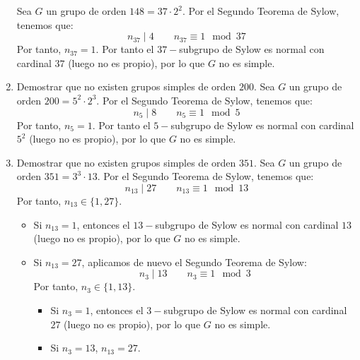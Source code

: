 \begin{ejercicio}
\begin{enumerate}
        Sea $G$ un grupo de orden $148=37\cdot 2^2$. Por el Segundo Teorema de Sylow, tenemos que:
        \begin{equation*}
            n_{37} \mid 4 \qquad n_{37} \equiv 1 \mod 37
        \end{equation*}
        Por tanto, $n_{37}=1$. Por tanto el $37-$subgrupo de Sylow es normal con cardinal $37$ (luego no es propio), por lo que $G$ no es simple.
        \item Demostrar que no existen grupos simples de orden $200$.
        Sea $G$ un grupo de orden $200=5^2\cdot 2^3$. Por el Segundo Teorema de Sylow, tenemos que:
        \begin{equation*}
            n_5 \mid 8 \qquad n_5 \equiv 1 \mod 5
        \end{equation*}
        Por tanto, $n_5=1$. Por tanto el $5-$subgrupo de Sylow es normal con cardinal $5^2$ (luego no es propio), por lo que $G$ no es simple.
        \item Demostrar que no existen grupos simples de orden $351$.
        Sea $G$ un grupo de orden $351=3^3\cdot 13$. Por el Segundo Teorema de Sylow, tenemos que:
        \begin{equation*}
            n_{13} \mid 27 \qquad n_{13} \equiv 1 \mod 13
        \end{equation*}
        Por tanto, $n_{13}\in \{1,27\}$.
        \begin{itemize}
            \item Si $n_{13}=1$, entonces el $13-$subgrupo de Sylow es normal con cardinal $13$ (luego no es propio), por lo que $G$ no es simple.
            \item Si $n_{13}=27$, aplicamos de nuevo el Segundo Teorema de Sylow:
            \begin{equation*}
                n_3 \mid 13 \qquad n_3 \equiv 1 \mod 3
            \end{equation*}
            Por tanto, $n_3\in \{1,13\}$.
            \begin{itemize}
                \item Si $n_3=1$, entonces el $3-$subgrupo de Sylow es normal con cardinal $27$ (luego no es propio), por lo que $G$ no es simple.
                \item Si $n_3=13$, $n_{13}=27$.
                

\end{itemize}
\end{itemize}
\end{enumerate}
\end{ejercicio}
